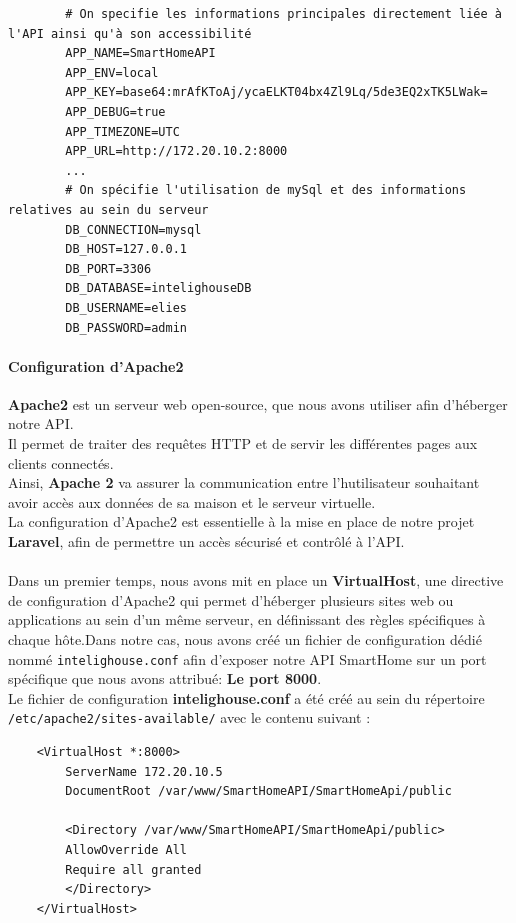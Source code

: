 \documentclass[10pt, a4paper]{report}
\begin{document}
	\begin{lstlisting}
		# On specifie les informations principales directement liée à l'API ainsi qu'à son accessibilité
		APP_NAME=SmartHomeAPI
		APP_ENV=local
		APP_KEY=base64:mrAfKToAj/ycaELKT04bx4Zl9Lq/5de3EQ2xTK5LWak=
		APP_DEBUG=true
		APP_TIMEZONE=UTC
		APP_URL=http://172.20.10.2:8000
		...
		# On spécifie l'utilisation de mySql et des informations relatives au sein du serveur
		DB_CONNECTION=mysql
		DB_HOST=127.0.0.1
		DB_PORT=3306
		DB_DATABASE=intelighouseDB
		DB_USERNAME=elies
		DB_PASSWORD=admin
	\end{lstlisting}
	\paragraph{Configuration d'Apache2}
	\textbf{Apache2} est un serveur web open-source, que nous avons utiliser afin d'héberger notre API.\\
	Il permet de traiter des requêtes HTTP et de servir les différentes pages aux clients connectés.\\
	Ainsi, \textbf{Apache 2} va assurer la communication entre l'hutilisateur souhaitant avoir accès aux données de sa maison et le serveur virtuelle.\\
	La configuration d'Apache2 est essentielle à la mise en place de notre projet \textbf{Laravel}, afin de permettre un accès sécurisé et contrôlé à l'API.\\\\
	Dans un premier temps, nous avons mit en place un \textbf{VirtualHost}, une directive de configuration d’Apache2 qui permet d’héberger plusieurs sites web ou applications au sein d'un même serveur, en définissant des règles spécifiques à chaque hôte.Dans notre cas, nous avons créé un fichier de configuration dédié nommé \texttt{intelighouse.conf} afin d’exposer notre API SmartHome sur un port spécifique que nous avons attribué: \textbf{Le port 8000}.\\
	Le fichier de configuration \textbf{intelighouse.conf} a été créé au sein du répertoire \texttt{/etc/apache2/sites-available/} avec le contenu suivant :
	
	\begin{lstlisting}
	<VirtualHost *:8000>
		ServerName 172.20.10.5
		DocumentRoot /var/www/SmartHomeAPI/SmartHomeApi/public
		
		<Directory /var/www/SmartHomeAPI/SmartHomeApi/public>
		AllowOverride All
		Require all granted
		</Directory>
	</VirtualHost>
	\end{lstlisting}
	
\end{document}
